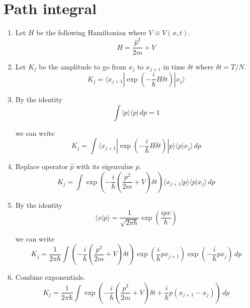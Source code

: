 \documentclass[12pt]{article}
\begin{document}
\section*{Path integral}

\begin{enumerate}

\item
Let $H$ be the following Hamiltonian where $V\equiv V(x,t)$.
\begin{equation*}
H=\frac{\hat p^2}{2m}+V
\end{equation*}

\item
Let $K_j$ be the amplitude to go from $x_j$ to $x_{j+1}$
in time $\delta t$ where $\delta t=T/N$.
\begin{equation*}
K_j=\langle x_{j+1}|\exp\left(-\frac{i}{\hbar}H\delta t\right)|x_j\rangle
\end{equation*}

\item
By the identity
\begin{equation*}
\int|p\rangle\langle p|\,dp=1
\end{equation*}

we can write
\begin{equation*}
K_j=\int\langle x_{j+1}|\exp\left(-\frac{i}{\hbar}H\delta t\right)
|p\rangle\langle p|x_j\rangle\,dp
\end{equation*}

\item
Replace operator $\hat p$ with its eigenvalue $p$.
\begin{equation*}
K_j=\int
\exp\left(-\frac{i}{\hbar}\left(\frac{p^2}{2m}+V\right)\delta t\right)
\langle x_{j+1}|p\rangle\langle p|x_j\rangle\,dp
\end{equation*}

\item
By the identity
\begin{equation*}
\langle x|p\rangle=\frac{1}{\sqrt{2\pi\hbar}}\exp\left(\frac{ipx}{\hbar}\right)
\end{equation*}

we can write
\begin{equation*}
K_j=\frac{1}{2\pi\hbar}
\int
\left(-\frac{i}{\hbar}\left(\frac{p^2}{2m}+V\right)\delta t\right)
\exp\left(\frac{i}{\hbar}px_{j+1}\right)
\exp\left(-\frac{i}{\hbar}px_j\right)
\,dp
\end{equation*}

\item
Combine exponentials.
\begin{equation*}
K_j=\frac{1}{2\pi\hbar}
\int
\exp\left(-\frac{i}{\hbar}
\left(\frac{p^2}{2m}+V\right)
\delta t
+\frac{i}{\hbar}p(x_{j+1}-x_j)\right)
\,dp
\end{equation*}


\end{enumerate}
\end{document}
